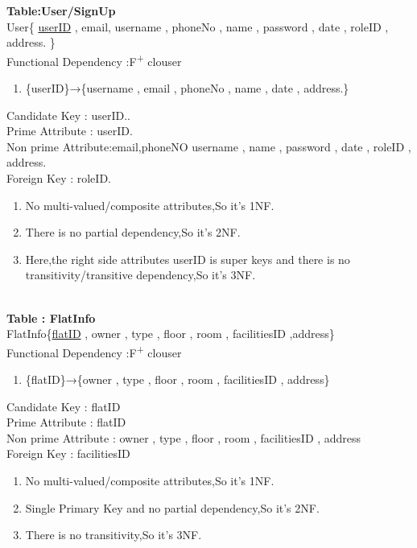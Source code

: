 \textbf{Table:User/SignUp}\\
User\{ \underline{userID} , email, username , phoneNo
, name , password , date , roleID , address. \}\\
\newline
Functional Dependency :F\textsuperscript{+} clouser
\begin{enumerate}
\item
\{userID\}→\{username , email , phoneNo , name , date , address.\}\\
\end{enumerate}
Candidate Key : userID..\\
Prime Attribute : userID.\\
Non prime Attribute:email,phoneNO username , name , password , date , roleID , address.\\
Foreign Key : roleID.\\
 
\begin{enumerate}

\item No multi-valued/composite attributes,So it's 1NF.
\item  There is no partial dependency,So it's 2NF.
\item Here,the right side attributes userID is super keys and there is no transitivity/transitive dependency,So it's 3NF.\\
\end{enumerate}\\

\newpage
\noindent
\textbf{Table : FlatInfo}\\
FlatInfo\{\underline{flatID} , owner , type , floor , room , facilitiesID ,address\}\\
\newline
Functional Dependency :F\textsuperscript{+} clouser
\begin{enumerate}
\item 
 
\{flatID\}→\{owner , type , floor , room , facilitiesID , address\}\\
\end{enumerate}
Candidate Key : flatID\\
Prime Attribute : flatID\\
Non prime Attribute : owner , type , floor , room , facilitiesID , address\\
Foreign Key : facilitiesID\\
\begin{enumerate}
\item No multi-valued/composite attributes,So it's 1NF.
\item Single Primary Key and no partial dependency,So it's 2NF.
\item There is no transitivity,So it's 3NF.\\
\end{enumerate}
 
